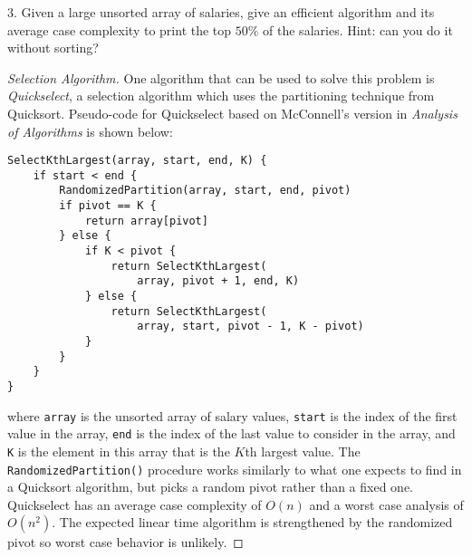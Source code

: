 \documentclass{scrartcl}
\begin{document}
\begin{flushleft}
    \newpage
    3. Given a large unsorted array of salaries, give an efficient algorithm and its average case
    complexity to print the top $50\%$ of the salaries. Hint: can you do it without sorting?
    \begin{proof}[Selection Algorithm]\let\qed\relax
        One algorithm that can be used to solve this problem is \textit{Quickselect}, a selection
        algorithm which uses the partitioning technique from Quicksort. Pseudo-code for Quickselect
        based on McConnell's version in \textit{Analysis of Algorithms} is shown below:
        \medskip
\begin{verbatim}
SelectKthLargest(array, start, end, K) {
    if start < end {
        RandomizedPartition(array, start, end, pivot)
        if pivot == K {
            return array[pivot]
        } else {
            if K < pivot {
                return SelectKthLargest(
                    array, pivot + 1, end, K)
            } else {
                return SelectKthLargest(
                    array, start, pivot - 1, K - pivot)
            }
        }
    }
}
\end{verbatim}
        where \verb|array| is the unsorted array of salary values, \verb|start| is the index of the
        first value in the array, \verb|end| is the index of the last value to consider in the
        array, and \verb|K| is the element in this array that is the $K$th largest value. The
        \verb|RandomizedPartition()| procedure works similarly to what one expects to find in a
        Quicksort algorithm, but picks a random pivot rather than a fixed one. Quickselect has an
        average case complexity of $O(n)$ and a worst case analysis of $O(n^2)$. The expected linear
        time algorithm is strengthened by the randomized pivot so worst case behavior is unlikely.
        \bigskip


\end{proof}
\end{flushleft}
\end{document}
